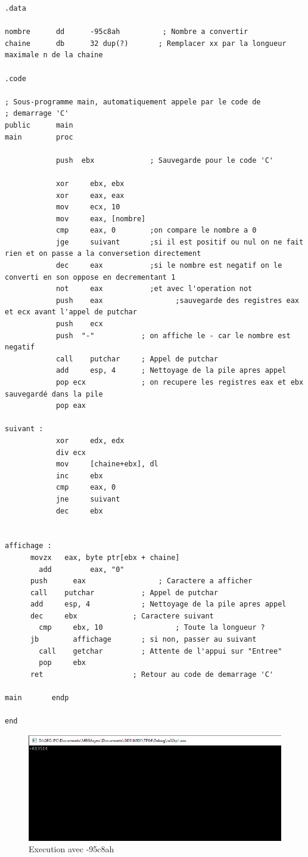 \documentclass[11pt]{report}
\begin{document}
\begin{lstlisting}
.data

nombre      dd      -95c8ah          ; Nombre a convertir
chaine      db      32 dup(?)       ; Remplacer xx par la longueur maximale n de la chaine

.code

; Sous-programme main, automatiquement appele par le code de
; demarrage 'C'
public      main
main        proc

			push  ebx             ; Sauvegarde pour le code 'C'

			xor		ebx, ebx
			xor		eax, eax
			mov		ecx, 10
			mov		eax, [nombre]
			cmp 	eax, 0        ;on compare le nombre a 0
			jge 	suivant       ;si il est positif ou nul on ne fait rien et on passe a la conversetion directement
			dec 	eax           ;si le nombre est negatif on le converti en son oppose en decrementant 1
			not 	eax           ;et avec l'operation not
			push 	eax				    ;sauvegarde des registres eax et ecx avant l'appel de putchar
			push	ecx
			push  "-"           ; on affiche le - car le nombre est negatif
			call    putchar     ; Appel de putchar
			add     esp, 4      ; Nettoyage de la pile apres appel
			pop ecx             ; on recupere les registres eax et ebx sauvegardé dans la pile
			pop eax

suivant :
			xor 	edx, edx
			div	ecx
			mov		[chaine+ebx], dl
			inc		ebx
			cmp		eax, 0
			jne		suivant
			dec		ebx


affichage :
      movzx   eax, byte ptr[ebx + chaine]
	    add			eax, "0"
      push   	eax         		; Caractere a afficher
      call    putchar     		; Appel de putchar
      add     esp, 4      		; Nettoyage de la pile apres appel
  	  dec     ebx             ; Caractere suivant
	    cmp     ebx, 10 				; Toute la longueur ?
      jb     	affichage       ; si non, passer au suivant
	    call    getchar         ; Attente de l'appui sur "Entree"
	    pop     ebx
      ret                     ; Retour au code de demarrage 'C'

main       endp

end
\end{lstlisting}

\begin{figure}[ht]
\includegraphics[width=12cm]{capture7.PNG}
\caption{Execution avec -95c8ah}
\end{figure}
\end{document}
